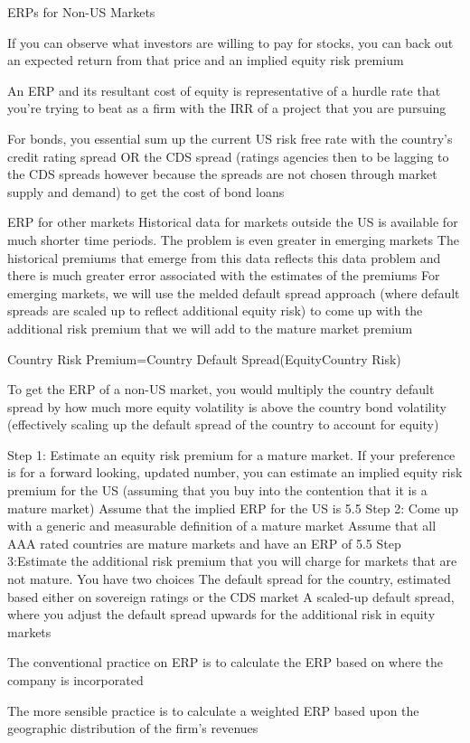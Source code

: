 \documentclass[10pt]{article}
\begin{document}
    \begin{core}{ERPs for Non-US Markets}

      If you can observe what investors are willing to pay for stocks, you can back out an expected return from that price and an implied equity risk premium

      An ERP and its resultant cost of equity is representative of a hurdle rate that you’re trying to beat as a firm with the IRR of a project that you are pursuing

      For bonds, you essential sum up the current US risk free rate with the country’s credit rating spread OR the CDS spread (ratings agencies then to be lagging to the CDS spreads however because the spreads are not chosen through market supply and demand) to get the cost of bond loans

      ERP for other markets
      Historical data for markets outside the US is available for much shorter time periods. The problem is even greater in emerging markets
      The historical premiums that emerge from this data reflects this data problem and there is much greater error associated with the estimates of the premiums
      For emerging markets, we will use the melded default spread approach (where default spreads are scaled up to reflect additional equity risk) to come up with the additional risk premium that we will add to the mature market premium

      Country Risk Premium=Country Default Spread(EquityCountry Risk)

      To get the ERP of a non-US market, you would multiply the country default spread by how much more equity volatility is above the country bond volatility (effectively scaling up the default spread of the country to account for equity)

      Step 1: Estimate an equity risk premium for a mature market. If your preference is for a forward looking, updated number, you can estimate an implied equity risk premium for the US (assuming that you buy into the contention that it is a mature market)
      Assume that the implied ERP for the US is 5.5%
      Step 2: Come up with a generic and measurable definition of a mature market
      Assume that all AAA rated countries are mature markets and have an ERP of 5.5%
      Step 3:Estimate the additional risk premium that you will charge for markets that are not mature. You have two choices
      The default spread for the country, estimated based either on sovereign ratings or the CDS market
      A scaled-up default spread, where you adjust the default spread upwards for the additional risk in equity markets

      The conventional practice on ERP is to calculate the ERP based on where the company is incorporated

      The more sensible practice is to calculate a weighted ERP based upon the geographic distribution of the firm’s revenues

    \end{core}
\end{document}
